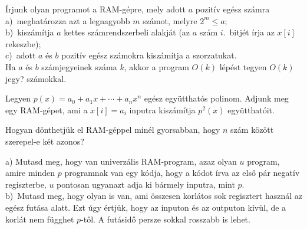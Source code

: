 \begin{Exercise}[counter={sorszam}, difficulty=0]
	Írjunk olyan programot a RAM-gépre, mely adott $a$ pozitív egész számra\\
	a)~meghatározza azt a legnagyobb $m$ számot, melyre $2^m \le a$;\\
	b)~kiszámítja $a$ kettes számrendszerbeli alakját (az $a$ szám $i$.\ bitjét írja az $x[i]$ rekeszbe);\\
	c)~adott $a$ és $b$ pozitív egész számokra kiszámítja a szorzatukat.\\
	Ha $a$ és $b$ számjegyeinek száma $k$, akkor a program $O(k)$ lépést tegyen $O(k)$ jegy? számokkal.
\end{Exercise}	

\begin{Exercise}[counter={sorszam}, difficulty=0]
	Legyen $p(x)=a_0 + a_1 x +\cdots + a_n x^n$ eg\'esz egy\"utthat\'os polinom. Adjunk meg egy RAM-g\'epet, ami a $x[i]=a_i$ inputra kisz\'am\'itja $p^2(x)$ egy\"utthat\'oit.
\end{Exercise}	

\begin{Exercise}[counter={sorszam}, difficulty=0]
	Hogyan dönthetjük el RAM-géppel min\'el gyorsabban, hogy $n$ szám között szerepel-e két azonos?
\end{Exercise}		 

\begin{Exercise}[counter={sorszam}, difficulty=0]
	a) Mutasd meg, hogy van univerz\'alis RAM-program, azaz olyan $u$ program, amire minden $p$ programnak van egy k\'odja, hogy a k\'odot \'irva az els\H o p\'ar negat\'iv regiszterbe, $u$ pontosan ugyanazt adja ki b\'armely inputra, mint $p$.\\
	b)~\hard Mutasd meg, hogy olyan is van, ami \"osszesen korl\'atos sok regisztert haszn\'al az eg\'esz fut\'asa alatt. Ezt \'ugy \'ertj\"uk, hogy az inputon \'es az outputon k\'iv\"ul, de a korl\'at nem f\"ugghet $p$-t\H ol. A fut\'asid\H o persze sokkal rosszabb is lehet.
\end{Exercise}		


